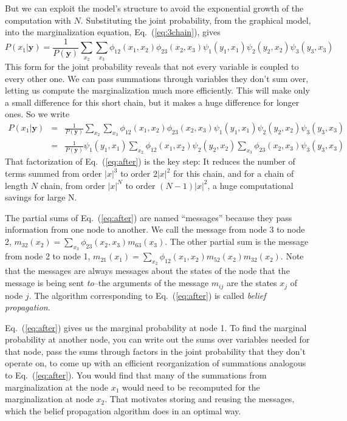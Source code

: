 But we can exploit the model's structure to avoid the
exponential growth of the computation with $N$.
Substituting the joint probability, from the graphical model, into the
marginalization equation, Eq.~(\ref{eq:3chain}), gives
\begin{equation}
P(x_1|\mathbf{y}) = 
\frac{1}{P(\mathbf{y})} \sum_{x_2} \sum_{x_3}  
\phi_{12}(x_1, x_2)  \phi_{23}(x_2, x_3) \psi_{1}(y_1, x_1) \psi_{2}(y_2, x_2) \psi_{3}(y_3, x_3) 
\label{eq:3chainb}
\end{equation}
This form for the joint probability reveals that not every variable is
coupled to every other one.  We can pass summations
through  variables they don't sum over, letting us compute the
marginalization much more efficiently.  This will make only a small
difference for this short chain, but it makes a huge difference
for longer ones.  So we write
\begin{eqnarray}
P(x_1|\mathbf{y}) 
& = & 
\frac{1}{P(\mathbf{y})} \sum_{x_2} \sum_{x_3}  
\phi_{12}(x_1, x_2)  \phi_{23}(x_2, x_3)
\psi_{1}(y_1, x_1) \psi_{2}(y_2, x_2) \psi_{3}(y_3, x_3)  
\label{eq:before}
\\
& = &
\frac{1}{P(\mathbf{y})}
\psi_{1}(y_1, x_1) 
\sum_{x_2} \phi_{12}(x_1, x_2) \psi_{2}(y_2, x_2) 
\sum_{x_3}   \phi_{23}(x_2, x_3)  \psi_{3}(y_3, x_3)  
\label{eq:after} 
\end{eqnarray}
That factorization of Eq.~(\ref{eq:after}) is the key step:
It reduces the number of terms summed from order $|x|^3$ to order $2
|x|^2$ for this chain, and for a chain of length $N$ chain, from order $|x|^N$ to order $(N-1) |x|^2$, a
huge computational savings for large N.  

The partial sums of
Eq.~(\ref{eq:after}) are named  ``messages'' because they pass information from one node to another.  We call the message from node 3
to node 2, $m_{32}(x_2)  = \sum_{x_3}   \phi_{23}(x_2, x_3)
m_{63}(x_3) $.  The other partial sum is the message from node 2 to
node 1, 
$m_{21}(x_1)   = \sum_{x_2} \phi_{12}(x_1, x_2)  m_{52}(x_2)  
m_{32}(x_2) $.
Note that the messages are always messages about
the states of the node that the message is being sent {\em to}--the
arguments of the message $m_{ij}$ are the states $x_j$ of node $j$.  The algorithm corresponding to Eq.~(\ref{eq:after}) is called {\em belief propagation}.

Eq.~(\ref{eq:after}) gives us the marginal probability at node 1.  To
find the marginal probability at another node, you 
can write out the sums over variables needed for that node, pass the
sums through factors in the joint probability that they don't operate
on, to come up with an efficient reorganization of summations analogous to
Eq.~(\ref{eq:after}).  You would find that many
of the summations from marginalization at the node $x_1$  would need
to be recomputed for the marginalization at node $x_2$.  That
motivates storing and reusing the messages, which the belief propagation algorithm does in an optimal way.

